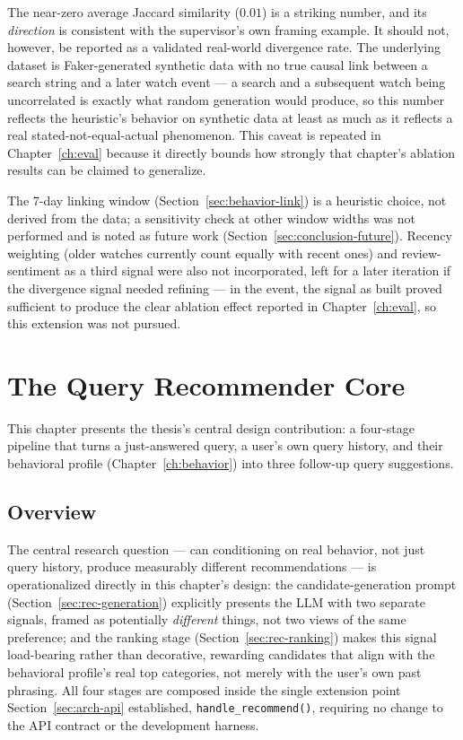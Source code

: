 \documentclass[11pt,a4paper,oneside]{book}
\newcommand{\code}[1]{\texttt{#1}}
\begin{document}
The near-zero average Jaccard similarity ($0.01$) is a striking number, and its \emph{direction} is
consistent with the supervisor's own framing example. It should not, however, be reported as a
validated real-world divergence rate. The underlying dataset is Faker-generated synthetic data with
no true causal link between a search string and a later watch event --- a search and a subsequent
watch being uncorrelated is exactly what random generation would produce, so this number reflects
the heuristic's behavior on synthetic data at least as much as it reflects a real
stated-not-equal-actual phenomenon. This caveat is repeated in Chapter~\ref{ch:eval} because it
directly bounds how strongly that chapter's ablation results can be claimed to generalize.

The 7-day linking window (Section~\ref{sec:behavior-link}) is a heuristic choice, not derived from
the data; a sensitivity check at other window widths was not performed and is noted as future work
(Section~\ref{sec:conclusion-future}). Recency weighting (older watches currently count equally
with recent ones) and review-sentiment as a third signal were also not incorporated, left for a
later iteration if the divergence signal needed refining --- in the event, the signal as built
proved sufficient to produce the clear ablation effect reported in Chapter~\ref{ch:eval}, so this
extension was not pursued.

\chapter{The Query Recommender Core}
\label{ch:recommender}

This chapter presents the thesis's central design contribution: a four-stage pipeline that turns a
just-answered query, a user's own query history, and their behavioral profile
(Chapter~\ref{ch:behavior}) into three follow-up query suggestions.

\section{Overview}
\label{sec:rec-overview}

The central research question --- can conditioning on real behavior, not just query history,
produce measurably different recommendations --- is operationalized directly in this chapter's
design: the candidate-generation prompt (Section~\ref{sec:rec-generation}) explicitly presents the
LLM with two separate signals, framed as potentially \emph{different} things, not two views of the
same preference; and the ranking stage (Section~\ref{sec:rec-ranking}) makes this signal
load-bearing rather than decorative, rewarding candidates that align with the behavioral profile's
real top categories, not merely with the user's own past phrasing. All four stages are composed
inside the single extension point Section~\ref{sec:arch-api} established,
\code{handle\_recommend()}, requiring no change to the API contract or the development harness.
\end{document}

